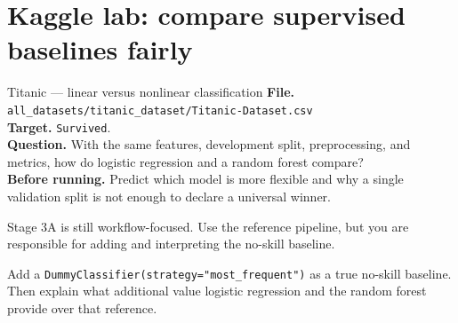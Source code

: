 \section{Kaggle lab: compare supervised baselines fairly}
\label{sec:kaggle-titanic-supervised}

\begin{kaggleproject}{Titanic --- linear versus nonlinear classification}
\textbf{File.} \texttt{all\_datasets/titanic\_dataset/Titanic-Dataset.csv}\\
\textbf{Target.} \texttt{Survived}.\\
\textbf{Question.} With the same features, development split, preprocessing, and metrics, how do logistic regression and a random forest compare?\\
\textbf{Before running.} Predict which model is more flexible and why a single validation split is not enough to declare a universal winner.

\begin{labmode}
Stage 3A is still workflow-focused. Use the reference pipeline, but you are responsible for adding and interpreting the no-skill baseline.
\end{labmode}



\begin{tryit}
Add a \texttt{DummyClassifier(strategy="most\_frequent")} as a true no-skill baseline. Then explain what additional value logistic regression and the random forest provide over that reference.
\end{tryit}
\end{kaggleproject}


